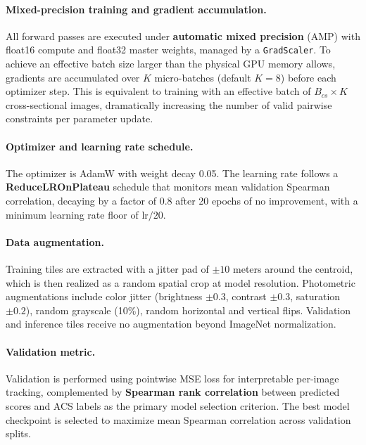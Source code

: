 \documentclass{article}
\begin{document}
\paragraph{Mixed-precision training and gradient accumulation.}
All forward passes are executed under \textbf{automatic mixed precision} (AMP) with float16 compute and float32 master weights, managed by a \texttt{GradScaler}. To achieve an effective batch size larger than the physical GPU memory allows, gradients are accumulated over $K$ micro-batches (default $K = 8$) before each optimizer step. This is equivalent to training with an effective batch of $B_{cs} \times K$ cross-sectional images, dramatically increasing the number of valid pairwise constraints per parameter update.

\paragraph{Optimizer and learning rate schedule.}
The optimizer is AdamW with weight decay 0.05. The learning rate follows a \textbf{ReduceLROnPlateau} schedule that monitors mean validation Spearman correlation, decaying by a factor of 0.8 after 20 epochs of no improvement, with a minimum learning rate floor of $\text{lr}/20$.

\paragraph{Data augmentation.}
Training tiles are extracted with a jitter pad of $\pm 10$ meters around the centroid, which is then realized as a random spatial crop at model resolution. Photometric augmentations include color jitter (brightness $\pm 0.3$, contrast $\pm 0.3$, saturation $\pm 0.2$), random grayscale (10\%), random horizontal and vertical flips. Validation and inference tiles receive no augmentation beyond ImageNet normalization.

\paragraph{Validation metric.}
Validation is performed using pointwise MSE loss for interpretable per-image tracking, complemented by \textbf{Spearman rank correlation} between predicted scores and ACS labels as the primary model selection criterion. The best model checkpoint is selected to maximize mean Spearman correlation across validation splits.
\end{document}
